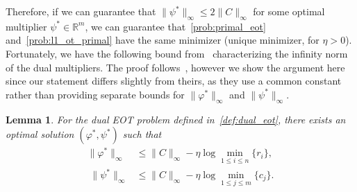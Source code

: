 \documentclass[10pt]{article}
\newcommand{\R}{\mathbb{R}}
\theoremstyle{plain}
\newtheorem{lemma}[theorem]{Lemma}
\theoremstyle{definition}
\theoremstyle{remark}
\begin{document}
Therefore, if we can guarantee that $\|\psi^*\|_\infty\leq 2\|C\|_\infty$ for some optimal multiplier $\psi^*\in\R^m$, we can guarantee that~\eqref{prob:primal_eot} and~\eqref{prob:l1_ot_primal} have the same minimizer (unique minimizer, for $\eta>0$). Fortunately, we have the following bound from~\cite{linEfficiencyEntropicRegularized2022} characterizing the infinity norm of the dual multipliers. The proof follows~\cite[Lemma 3]{linEfficiencyEntropicRegularized2022}, however we show the argument here since our statement differs slightly from theirs, as they use a common constant rather than providing separate bounds for $\|\varphi^*\|_\infty$ and $\|\psi^*\|_\infty$.
\begin{lemma}\label{lem:dual_infty_bound}
    For the dual EOT problem defined in~\eqref{def:dual_eot}, there exists an optimal solution $(\varphi^*,\psi^*)$ such that
    \begin{align*}
        \|\varphi^*\|_\infty&\leq \|C\|_\infty -\eta \log\underset{1\leq i\leq n}\min\{r_i\},\\
        \;\|\psi^*\|_\infty&\leq \|C\|_\infty -\eta \log\underset{1\leq j\leq m}\min\{c_j\}.
    \end{align*}
\end{lemma}
\end{document}
